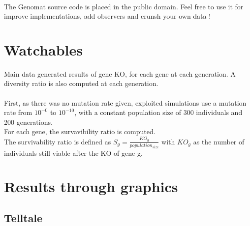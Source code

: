 \documentclass[]{report} %
\begin{document}
        \paragraph*{}
        The Genomat source code is placed in the public domain. Feel free to use it for improve implementations, add observers and crunsh your own data ! 



\section{Watchables}
    \paragraph*{}
    Main data generated results of gene KO, for each gene at each generation. 
    A diversity ratio is also computed at each generation.
    \paragraph*{}
     First, as there was no mutation rate given, exploited simulations use a mutation rate from $10^{-0}$ to $10^{-10}$, 
     with a constant population size of 300 individuals and 200 generations.\\
     For each gene, the survavibility ratio is computed. \\
     The survivability ratio is defined as $S_g = \frac{KO_g}{population_{size}}$ 
     with $KO_g$ as the number of individuals still viable after the KO of gene g.



\newpage
\section*{Results through graphics}
\newpage
\subsection{Telltale}
\end{document}
